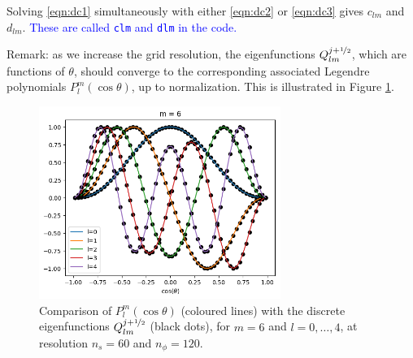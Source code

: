 \documentclass[11pt]{article}
\newcommand{\ns}{n_s}
\newcommand{\nph}{n_\phi}
\newcommand{\half}{\nicefrac{1}{2}}
\begin{document}
Solving \eqref{eqn:dc1} simultaneously with either \eqref{eqn:dc2} or \eqref{eqn:dc3} gives $c_{lm}$ and $d_{lm}$. \textcolor{blue}{These are called \texttt{clm} and \texttt{dlm} in the code.}

Remark: as we increase the grid resolution, the eigenfunctions $Q_{lm}^{j+\half}$, which are functions of $\theta$, should converge to the corresponding associated Legendre polynomials $P_l^m(\cos\theta)$, up to normalization. This is illustrated in Figure \ref{fig:Q}.

\begin{figure}
\centering
\includegraphics[width=0.7\textwidth]{Q.png}
\caption{Comparison of $P_l^m(\cos\theta)$ (coloured lines) with the discrete eigenfunctions $Q_{lm}^{j+\half}$ (black dots), for $m=6$ and $l=0,\ldots,4$, at resolution $\ns=60$ and $\nph=120$. \label{fig:Q}}
\end{figure}



\end{document}
